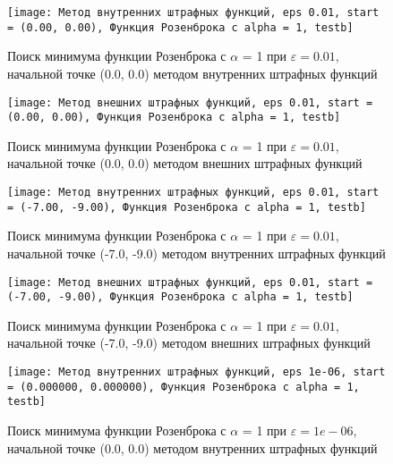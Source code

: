             \begin{figure}[H]
	        \centering
	        \texttt{[image: Метод внутренних штрафных функций, eps 0.01, start = (0.00, 0.00), Функция Розенброка с alpha = 1, testb]}%
	        \caption{Поиск минимума функции Розенброка с $\alpha$ = 1 при $\varepsilon = 0.01$, начальной точке (0.0, 0.0) методом внутренних штрафных функций}
	        \vspace*{-1.2cm}
            \end{figure}
            
            \begin{figure}[H]
	        \centering
	        \texttt{[image: Метод внешних штрафных функций, eps 0.01, start = (0.00, 0.00), Функция Розенброка с alpha = 1, testb]}%
	        \caption{Поиск минимума функции Розенброка с $\alpha$ = 1 при $\varepsilon = 0.01$, начальной точке (0.0, 0.0) методом внешних штрафных функций}
	        \vspace*{-1.2cm}
            \end{figure}
            
            \begin{figure}[H]
	        \centering
	        \texttt{[image: Метод внутренних штрафных функций, eps 0.01, start = (-7.00, -9.00), Функция Розенброка с alpha = 1, testb]}%
	        \caption{Поиск минимума функции Розенброка с $\alpha$ = 1 при $\varepsilon = 0.01$, начальной точке (-7.0, -9.0) методом внутренних штрафных функций}
	        \vspace*{-1.2cm}
            \end{figure}
            
            \begin{figure}[H]
	        \centering
	        \texttt{[image: Метод внешних штрафных функций, eps 0.01, start = (-7.00, -9.00), Функция Розенброка с alpha = 1, testb]}%
	        \caption{Поиск минимума функции Розенброка с $\alpha$ = 1 при $\varepsilon = 0.01$, начальной точке (-7.0, -9.0) методом внешних штрафных функций}
	        \vspace*{-1.2cm}
            \end{figure}
            
            \begin{figure}[H]
	        \centering
	        \texttt{[image: Метод внутренних штрафных функций, eps 1e-06, start = (0.000000, 0.000000), Функция Розенброка с alpha = 1, testb]}%
	        \caption{Поиск минимума функции Розенброка с $\alpha$ = 1 при $\varepsilon = 1e-06$, начальной точке (0.0, 0.0) методом внутренних штрафных функций}
	        \vspace*{-1.2cm}
            \end{figure}
            
